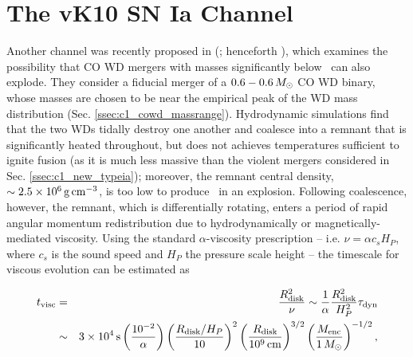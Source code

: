 
\section{The vK10 SN Ia Channel}
\label{sec:c1_vkchannel}

Another channel was recently proposed in \citeauthor{vkercj10} (\citeyear{vkercj10}; henceforth \citeal{vkercj10}), which examines the possibility that CO WD mergers with masses significantly below \Mch\ can also explode.  They consider a fiducial merger of a $0.6-0.6\,\Msun$ CO WD binary, whose masses are chosen to be near the empirical peak of the WD mass distribution (Sec. \ref{ssec:c1_cowd_massrange}).  Hydrodynamic simulations \citep{loreig09} find that the two WDs tidally destroy one another and coalesce into a remnant that is significantly heated throughout, but does not achieves temperatures sufficient to ignite fusion (as it is much less massive than the violent mergers considered in Sec. \ref{ssec:c1_new_typeia}); moreover, the remnant central density, $\sim2.5\times10^6\,\gcc$, is too low to produce \Ni\ in an explosion.  Following coalescence, however, the remnant, which is differentially rotating, enters a period of rapid angular momentum redistribution due to hydrodynamically or magnetically-mediated viscosity.  Using the standard $\alpha$-viscosity prescription \cite{shaks73} -- i.e. $\nu = \alpha c_s H_P$, where $c_s$ is the sound speed and $H_P$ the pressure scale height -- the timescale for viscous evolution can be estimated as

\begin{eqnarray}
t_\mrm{visc} &=& \frac{R_\mrm{disk}^2}{\nu} \sim \frac{1}{\alpha}\frac{R_\mrm{disk}^2}{H_P^2}\taudyn \nonumber \\
			&\sim& 3\times10^4\,\mrm{s}\left(\frac{10^{-2}}{\alpha}\right)\left(\frac{R_\mrm{disk}/H_P}{10}\right)^2\left(\frac{R_\mrm{disk}}{10^9\,\mrm{cm}}\right)^{3/2}\left(\frac{M_\mrm{enc}}{1\,\Msun}\right)^{-1/2},
\end{eqnarray}

